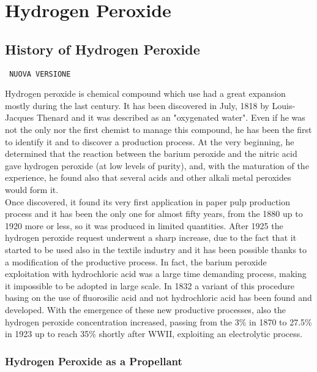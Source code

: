 \documentclass[a4paper]{report}
\begin{document}
\tableofcontents
\chapter{Hydrogen Peroxide}

\section{History of Hydrogen Peroxide}

\texttt{\color{green} NUOVA VERSIONE}

Hydrogen peroxide is chemical compound which use had a great expansion mostly during the last century. It has been discovered in July, 1818 by Louis-Jacques Thenard and it was described as an "oxygenated water". Even if he was not the only nor the first chemist to manage this compound, he has been the first to identify it and to discover a production process. At the very beginning, he determined that the reaction between the barium peroxide and the nitric acid gave hydrogen peroxide (at low levels of purity), and, with the maturation of the experience, he found also that several acids and other alkali metal peroxides would form it. \\ 
Once discovered, it found its very first application in paper pulp production process and it has been the only one for almost fifty years, from the 1880 up to 1920 more or less, so it was produced in limited quantities. After 1925 the hydrogen peroxide request underwent a sharp increase, due to the fact that it started to be used also in the textile industry and it has been possible thanks to a modification of the productive process. In fact, the barium peroxide exploitation with hydrochloric acid was a large time demanding process, making it impossible to be adopted in large scale. In 1832 a variant of this procedure basing on the use of fluorosilic acid and not hydrochloric acid has been found and developed. With the emergence of these new productive processes, also the hydrogen peroxide concentration increased, passing from the 3\% in 1870 to 27.5\% in 1923 up to reach 35\% shortly after WWII, exploiting an electrolytic process.\\

\subsection{Hydrogen Peroxide as a Propellant}
\end{document}

